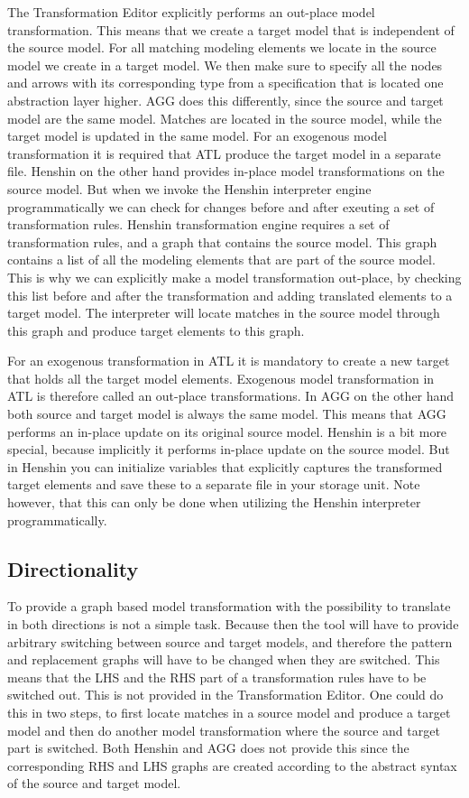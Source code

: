 The Transformation Editor explicitly performs an out-place model
transformation. This means that we create a target model that is independent of
the source model. For all matching modeling elements we locate in the source
model we create in a target model. We then make sure to specify all the nodes
and arrows with its corresponding type from a specification that is located one
abstraction layer higher. AGG does this differently, since the source and target
model are the same model. Matches are located in the source model, while the
target model is updated in the same model. For an exogenous model transformation
it is required that ATL produce the target model in a separate file. Henshin on
the other hand provides in-place model transformations on the source model. But
when we invoke the Henshin interpreter engine programmatically we can check for
changes before and after exeuting a set of transformation rules. Henshin
transformation engine requires a set of transformation rules, and a graph that
contains the source model. This graph contains a list of all the modeling
elements that are part of the source model. This is why we can explicitly make a
model transformation out-place, by checking this list before and after the
transformation and adding translated elements to a target model. The interpreter
will locate matches in the source model through this graph and produce target
elements to this graph. 

For an exogenous transformation in ATL it is mandatory to create a new target
that holds all the target model elements. Exogenous model transformation in ATL
is therefore called an out-place transformations. In AGG on the other hand both
source and target model is always the same model. This means that AGG performs an
in-place update on its original source model. Henshin is a bit more special,
because implicitly it performs in-place update on the source model. But in
Henshin you can initialize variables that explicitly captures the transformed
target elements and save these to a separate file in your storage unit. Note
however, that this can only be done when utilizing the Henshin interpreter
programmatically. 

\subsection{Directionality}

To provide a graph based model transformation with the possibility to translate
in both directions is not a simple task. Because then the tool will have to
provide arbitrary switching between source and target models, and therefore the
pattern and replacement graphs will have to be changed when they are switched.
This means that the LHS and the RHS part of a transformation rules have to be
switched out. This is not provided in the Transformation Editor. One could do
this in two steps, to first locate matches in a source model and produce a
target model and then do another model transformation where the source and
target part is switched. Both Henshin and AGG does not provide this since the
corresponding RHS and LHS graphs are created according to the abstract syntax of
the source and target model. 



